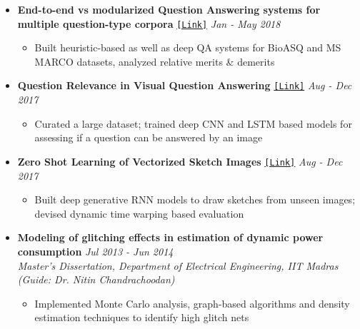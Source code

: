 \documentclass[10pt,a4paper,English]{article}
\newcommand\itemyear[1]{\hfill \emph{\color{itemyear} #1}}
\newcommand\itemenv{\setlength\itemsep{0.5pt} \addtolength{\itemindent}{-5mm}\vspace{-1.5mm}}
\begin{document}
\begin{itemize}
    \item \textbf{End-to-end vs modularized Question Answering systems for multiple question-type corpora} \href{https://github.com/nitish-kulkarni/BioASQ-Question-Answering}{\texttt{[Link]}} \itemyear{Jan - May 2018}
        \begin{itemize} \itemenv
            \item Built heuristic-based as well as deep QA systems for BioASQ and MS MARCO datasets, analyzed relative merits \& demerits
        \end{itemize}
        
    \item \textbf{Question Relevance in Visual Question Answering} \href{https://github.com/nitish-kulkarni/Question-Relevance-in-VQA}{\texttt{[Link]}} \itemyear{Aug - Dec 2017}
        \begin{itemize} \itemenv
            \item Curated a large dataset; trained deep CNN and LSTM based models for assessing if a question can be answered by an image
        \end{itemize}

    \item \textbf{Zero Shot Learning of Vectorized Sketch Images} \href{https://github.com/nitish-kulkarni/Generation-of-vector-images-using-GANs}{\texttt{[Link]}} \itemyear{Aug - Dec 2017}
        \begin{itemize} \itemenv
            \item Built deep generative RNN models to draw sketches from unseen images; devised dynamic time warping based evaluation
        \end{itemize}

    \item \textbf{Modeling of glitching effects in estimation of dynamic power consumption} \itemyear{Jul 2013 - Jun 2014} \\
    \emph{Master's Dissertation, Department of Electrical Engineering, IIT Madras (Guide: Dr. Nitin Chandrachoodan)}
        \begin{itemize} \itemenv
            \item Implemented Monte Carlo analysis, graph-based algorithms and density estimation techniques to identify high glitch nets
        \end{itemize}
\end{itemize}
\end{document}
